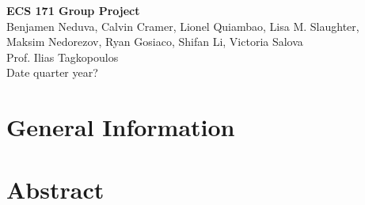 \documentclass[a4paper, 12pt]{report}
\begin{document}

\begin{center}
{\huge  \textbf{ECS 171 Group Project}} \\
{\large Benjamen Neduva, Calvin Cramer, Lionel Quiambao, Lisa M. Slaughter, \\Maksim Nedorezov, Ryan Gosiaco, Shifan Li, Victoria Salova} \\
Prof. Ilias Tagkopoulos\\
Date quarter year?\\

\end{center}

\section{General Information}
\lipsum[1]

\section{Abstract}
\lipsum[2]
\end{document}
